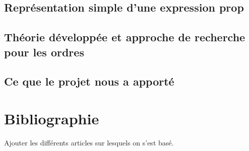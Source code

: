 \documentclass[a4paper, oneside]{report}
\begin{document}
\section*{Représentation simple d'une expression prop}
\section*{Théorie développée et approche de recherche pour les ordres}
\section*{Ce que le projet nous a apporté}

\chapter*{Bibliographie}
Ajouter les différents articles sur lesquels on s'est basé.
\end{document}
